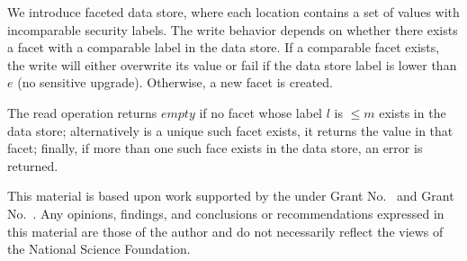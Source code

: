 \documentclass[acmsmall,10pt,review,anonymous]{acmart}\settopmatter{printfolios=true}
\begin{document}
\begin{itemize}
\begin{itemize}
                We introduce faceted data store, where each location 
                contains a set of values with incomparable security 
                labels.  The write behavior depends on whether there 
                exists a facet with a comparable label in the data 
                store.  If a comparable facet exists, the write will 
                either overwrite its value or fail if the data store 
                label is lower than $e$ (no sensitive upgrade).  
                Otherwise, a new facet is created.  

                The read operation returns $empty$ if no facet whose 
                label $l$ is $\leq m$ exists in the data store; 
                alternatively is a unique such facet exists, it 
                returns the value in that facet; finally, if more than 
                one such face exists in the data store, an error is 
                returned.
        \end{itemize}
\end{itemize}


\begin{acks}                            %
  This material is based upon work supported by the
   under Grant
  No.~ and Grant
  No.~.  Any opinions, findings, and
  conclusions or recommendations expressed in this material are those
  of the author and do not necessarily reflect the views of the
  National Science Foundation.
\end{acks}


%



\end{document}
